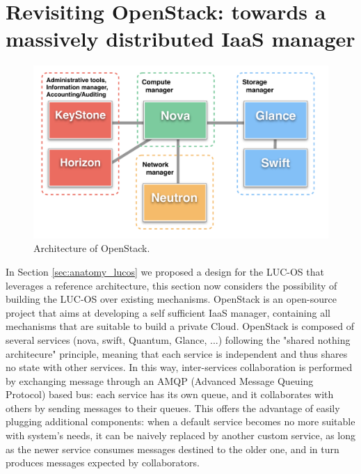 \section{Revisiting OpenStack: towards a massively distributed IaaS manager}


\begin{figure}
	\centerline{
	 \includegraphics[width=0.75\linewidth]{Figures/openstack_architecture.pdf}
  }
	\caption{Architecture of OpenStack.}%
	\label{fig:openstack_architecture}%
\end{figure}

In Section \ref{sec:anatomy_lucos} we proposed a design for the LUC-OS 
that leverages a reference architecture, this section now considers the 
possibility of building the LUC-OS over existing mechanisms. OpenStack is an 
open-source project that aims at developing a self sufficient IaaS manager, 
containing all mechanisms that are suitable to build a private Cloud. OpenStack 
is composed of several services (nova, swift, Quantum, Glance, ...) following 
the "shared nothing architecure" principle, meaning that each service is 
independent and thus shares no state with other services. In this way, 
inter-services collaboration is performed by exchanging message through an AMQP 
(Advanced Message Queuing Protocol) based bus: each service has its own queue, 
and it collaborates with others by sending messages to their queues. This offers
the advantage of easily plugging additional components: when a default service 
becomes no more suitable with system's needs, it can be naively replaced by 
another custom service, as long as the newer service consumes messages destined 
to the older one, and in turn produces messages expected by collaborators.

